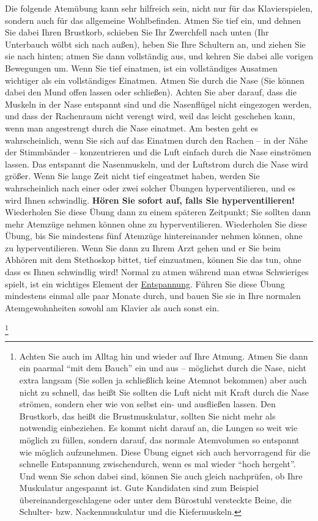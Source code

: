 Die folgende Atemübung kann sehr hilfreich sein, nicht nur für das Klavierspielen, sondern auch für das allgemeine Wohlbefinden.
Atmen Sie tief ein, und dehnen Sie dabei Ihren Brustkorb, schieben Sie Ihr Zwerchfell nach unten (Ihr Unterbauch wölbt sich nach außen), heben Sie Ihre Schultern an, und ziehen Sie sie nach hinten; atmen Sie dann vollständig aus, und kehren Sie dabei alle vorigen Bewegungen um.
Wenn Sie tief einatmen, ist ein vollständiges Ausatmen wichtiger als ein vollständiges Einatmen.
Atmen Sie durch die Nase (Sie können dabei den Mund offen lassen oder schließen). Achten Sie aber darauf, dass die Muskeln in der Nase entspannt sind und die Nasenflügel nicht eingezogen werden, und dass der Rachenraum nicht verengt wird, weil das leicht geschehen kann, wenn man angestrengt durch die Nase einatmet. Am besten geht es wahrscheinlich, wenn Sie sich auf das Einatmen durch den Rachen -- in der Nähe der Stimmbänder -- konzentrieren und die Luft einfach durch die Nase einströmen lassen. Das entspannt die Nasenmuskeln, und der Luftstrom durch die Nase wird größer.
Wenn Sie lange Zeit nicht tief eingeatmet haben, werden Sie wahrscheinlich nach einer oder zwei solcher Übungen hyperventilieren, und es wird Ihnen schwindlig. \textbf{Hören Sie sofort auf, falls Sie hyperventilieren!}
Wiederholen Sie diese Übung dann zu einem späteren Zeitpunkt; Sie sollten dann mehr Atemzüge nehmen können ohne zu hyperventilieren.
Wiederholen Sie diese Übung, bis Sie mindestens fünf Atemzüge hintereinander nehmen können, ohne zu hyperventilieren.
Wenn Sie dann zu Ihrem Arzt gehen und er Sie beim Abhören mit dem Stethoskop bittet, tief einzuatmen, können Sie das tun, ohne dass es Ihnen schwindlig wird!
Normal zu atmen während man etwas Schwieriges spielt, ist ein wichtiges Element der \hyperref[c1ii14]{Entspannung}.
Führen Sie diese Übung mindestens einmal alle paar Monate durch, und bauen Sie sie in Ihre normalen Atemgewohnheiten sowohl am Klavier als auch sonst ein.

\label{c1ii21uebung}\footnote{Achten Sie auch im Alltag hin und wieder auf Ihre Atmung. Atmen Sie dann ein paarmal \enquote{mit dem Bauch} ein und aus -- möglichst durch die Nase, nicht extra langsam (Sie sollen ja schließlich keine Atemnot bekommen) aber auch nicht zu schnell, das heißt Sie sollten die Luft nicht mit Kraft durch die Nase strömen, sondern eher wie von selbst ein- und ausfließen lassen. Den Brustkorb, das heißt die Brustmuskulatur, sollten Sie nicht mehr als notwendig einbeziehen. Es kommt nicht darauf an, die Lungen so weit wie möglich zu füllen, sondern darauf, das normale Atemvolumen so entspannt wie möglich aufzunehmen. Diese Übung eignet sich auch hervorragend für die schnelle Entspannung zwischendurch, wenn es mal wieder \enquote{hoch hergeht}. Und wenn Sie schon dabei sind, können Sie auch gleich nachprüfen, ob Ihre Muskulatur angespannt ist. Gute Kandidaten sind zum Beispiel übereinandergeschlagene oder unter dem Bürostuhl versteckte Beine, die Schulter- bzw. Nackenmuskulatur und die Kiefermuskeln.}


